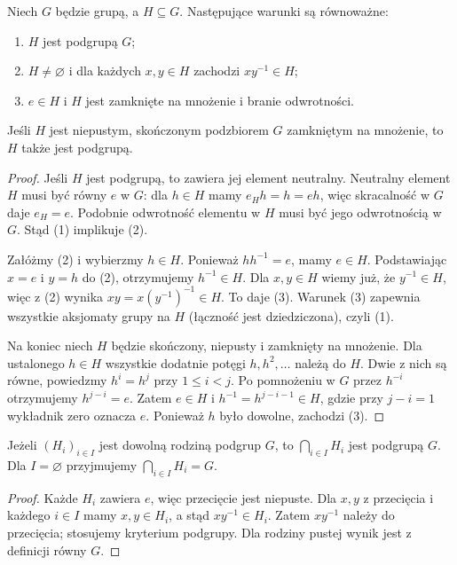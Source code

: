 \begin{twierdzenie}
\label{aa:tw:kryterium-podgrupy}
Niech $G$ będzie grupą, a $H\subseteq G$. Następujące
warunki są równoważne:
\begin{enumerate}
\item $H$ jest podgrupą $G$;
\item $H\ne\varnothing$ i dla każdych $x,y\in H$ zachodzi $xy^{-1}\in H$;
\item $e\in H$ i $H$ jest zamknięte na mnożenie i branie odwrotności.
\end{enumerate}
Jeśli $H$ jest niepustym, skończonym podzbiorem $G$ zamkniętym na mnożenie,
to $H$ także jest podgrupą.
\end{twierdzenie}
\begin{proof}
Jeśli $H$ jest podgrupą, to zawiera jej element neutralny.
Neutralny element $H$ musi być równy $e$ w $G$:
dla $h\in H$ mamy $e_Hh=h=eh$, więc skracalność w $G$
daje $e_H=e$. Podobnie odwrotność elementu w $H$
musi być jego odwrotnością w $G$. Stąd (1) implikuje (2).

Załóżmy (2) i wybierzmy $h\in H$. Ponieważ $hh^{-1}=e$,
mamy $e\in H$. Podstawiając $x=e$ i $y=h$ do (2),
otrzymujemy $h^{-1}\in H$. Dla $x,y\in H$ wiemy już,
że $y^{-1}\in H$, więc z (2) wynika $xy=x(y^{-1})^{-1}\in H$.
To daje (3). Warunek (3) zapewnia wszystkie aksjomaty grupy
na $H$ (łączność jest dziedziczona), czyli (1).

Na koniec niech $H$ będzie skończony, niepusty i zamknięty
na mnożenie. Dla ustalonego $h\in H$ wszystkie dodatnie
potęgi $h,h^2,\ldots$ należą do $H$. Dwie z nich są równe,
powiedzmy $h^i=h^j$ przy $1\le i<j$.
Po pomnożeniu w $G$ przez $h^{-i}$ otrzymujemy $h^{j-i}=e$.
Zatem $e\in H$ i $h^{-1}=h^{j-i-1}\in H$, gdzie
przy $j-i=1$ wykładnik zero oznacza $e$.
Ponieważ $h$ było dowolne, zachodzi (3).
\end{proof}

\begin{lemat}
\label{aa:lem:przeciecia}
Jeżeli $(H_i)_{i\in I}$ jest dowolną rodziną podgrup $G$,
to $\bigcap_{i\in I}H_i$ jest podgrupą $G$.
Dla $I=\varnothing$ przyjmujemy $\bigcap_{i\in I}H_i=G$.
\end{lemat}
\begin{proof}
Każde $H_i$ zawiera $e$, więc przecięcie jest niepuste.
Dla $x,y$ z przecięcia i każdego $i\in I$ mamy
$x,y\in H_i$, a stąd $xy^{-1}\in H_i$.
Zatem $xy^{-1}$ należy do przecięcia; stosujemy kryterium podgrupy.
Dla rodziny pustej wynik jest z definicji równy $G$.
\end{proof}

